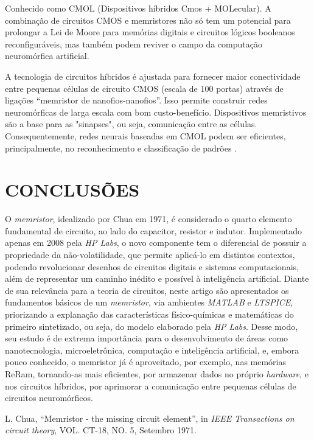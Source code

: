 \documentclass{ceel}
\begin{document}
\begin{multicols}{2}
Conhecido como CMOL (Dispositivos  híbridos Cmos + MOLecular). A combinação de circuitos CMOS e memristores não só tem um potencial para prolongar a Lei de Moore para memórias digitais e circuitos lógicos booleanos reconfiguráveis, mas também podem reviver o campo da computação neuromórfica artificial.
 
A tecnologia de circuitos híbridos é ajustada para fornecer maior conectividade entre pequenas células de circuito CMOS (escala de 100 portas) através de ligações “memristor de nanofios-nanofios”. Isso permite construir redes neuromórficas de larga escala com bom custo-benefício. Dispositivos memristivos são a base para as "sinapses", ou seja, comunicação entre as células. Consequentemente, redes neurais baseadas em CMOL podem ser eficientes, principalmente, no reconhecimento e classificação de padrões \cite{oito}.

\section{CONCLUSÕES}
O \emph{memristor}, idealizado por Chua em 1971, é considerado o quarto elemento fundamental de circuito, ao lado do capacitor, resistor e indutor. Implementado apenas em 2008 pela \emph{HP Labs}, o novo componente tem o diferencial de possuir a propriedade da não-volatilidade, que permite aplicá-lo em distintos contextos, podendo revolucionar desenhos de circuitos digitais e sistemas computacionais, além de representar um caminho inédito e possível à inteligência artificial. Diante de sua relevância para a teoria de circuitos, neste artigo são apresentados os fundamentos básicos de um \emph{memristor}, via ambientes \emph{MATLAB} e \emph{LTSPICE}, priorizando a explanação das características físico-químicas e matemáticas do primeiro sintetizado, ou seja, do modelo elaborado pela \emph{HP Labs}. 
Desse modo, seu estudo é de extrema importância para o desenvolvimento de áreas como nanotecnologia, microeletrônica, computação e inteligência artificial, e, embora pouco conhecido, o memristor já é aproveitado, por exemplo, nas memórias ReRam, tornando-as mais eficientes, por armazenar dados no próprio \emph{hardware}, e nos circuitos híbridos, por aprimorar a comunicação entre pequenas células de circuitos neuromórficos. 
\begin{thebibliography}{9}

    L. Chua,
    “Memristor - the missing circuit element”, 
    in \emph{IEEE Transactions on circuit theory}, VOL. CT-18, NO. 5, Setembro 1971.


\end{thebibliography}
\end{multicols}
\end{document}
